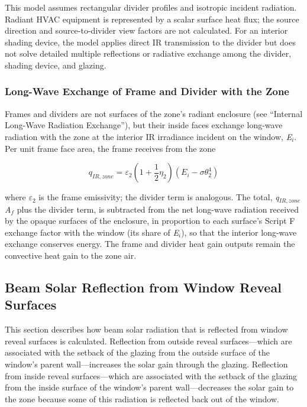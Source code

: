 This model assumes rectangular divider profiles and isotropic incident radiation. Radiant HVAC equipment is represented by a scalar surface heat flux; the source direction and source-to-divider view factors are not calculated. For an interior shading device, the model applies direct IR transmission to the divider but does not solve detailed multiple reflections or radiative exchange among the divider, shading device, and glazing.

\subsubsection{Long-Wave Exchange of Frame and Divider with the Zone}\label{long-wave-exchange-of-frame-and-divider-with-the-zone}

Frames and dividers are not surfaces of the zone's radiant enclosure (see ``Internal Long-Wave Radiation Exchange''), but their inside faces exchange long-wave radiation with the zone at the interior IR irradiance incident on the window, \emph{E\(_{i}\)}. Per unit frame face area, the frame receives from the zone

\begin{equation}
{q_{IR,zone}} = {\varepsilon_2}\left( {1 + \frac{1}{2}{\eta_2}} \right)\left( {{E_i} - \sigma \theta_2^4} \right)
\end{equation}

where \emph{\(\varepsilon_2\)} is the frame emissivity; the divider term is analogous. The total, \emph{q\(_{IR,zone}\)A\(_{f}\)} plus the divider term, is subtracted from the net long-wave radiation received by the opaque surfaces of the enclosure, in proportion to each surface's Script F exchange factor with the window (its share of \emph{E\(_{i}\)}), so that the interior long-wave exchange conserves energy. The frame and divider heat gain outputs remain the convective heat gain to the zone air.

\subsection{Beam Solar Reflection from Window Reveal Surfaces}\label{beam-solar-reflection-from-window-reveal-surfaces}

This section describes how beam solar radiation that is reflected from window reveal surfaces is calculated. Reflection from outside reveal surfaces---which are associated with the setback of the glazing from the outside surface of the window's parent wall---increases the solar gain through the glazing. Reflection from inside reveal surfaces---which are associated with the setback of the glazing from the inside surface of the window's parent wall---decreases the solar gain to the zone because some of this radiation is reflected back out of the window.

